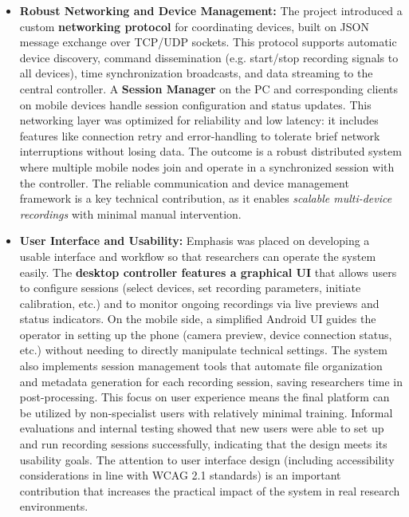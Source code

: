 \documentclass[11pt,a4paper]{report}
\begin{document}
\begin{itemize}
\item \textbf{Robust Networking and Device Management:} The project introduced a
  custom \textbf{networking protocol} for coordinating devices, built on JSON
  message exchange over TCP/UDP sockets. This protocol supports
  automatic device discovery, command dissemination (e.g. start/stop
  recording signals to all devices), time synchronization broadcasts,
  and data streaming to the central controller. A \textbf{Session Manager} on
  the PC and corresponding clients on mobile devices handle session
  configuration and status updates. This networking layer was optimized
  for reliability and low latency: it includes features like connection
  retry and error-handling to tolerate brief network interruptions
  without losing data. The outcome is a robust distributed system where
  multiple mobile nodes join and operate in a synchronized session with
  the controller. The reliable communication and device management
  framework is a key technical contribution, as it enables \textit{scalable
  multi-device recordings} with minimal manual intervention.

\item \textbf{User Interface and Usability:} Emphasis was placed on developing a
  usable interface and workflow so that researchers can operate the
  system easily. The \textbf{desktop controller features a graphical UI} that
  allows users to configure sessions (select devices, set recording
  parameters, initiate calibration, etc.) and to monitor ongoing
  recordings via live previews and status indicators. On the mobile
  side, a simplified Android UI guides the operator in setting up the
  phone (camera preview, device connection status, etc.) without needing
  to directly manipulate technical settings. The system also implements
  session management tools that automate file organization and metadata
  generation for each recording session, saving researchers time in
  post-processing. This focus on user experience means the final
  platform can be utilized by non-specialist users with relatively
  minimal training. Informal evaluations and internal testing showed
  that new users were able to set up and run recording sessions
  successfully, indicating that the design meets its usability goals.
  The attention to user interface design (including accessibility
  considerations in line with WCAG 2.1 standards) is an important
  contribution that increases the practical impact of the system in real
  research environments.


\end{itemize}
\end{document}
